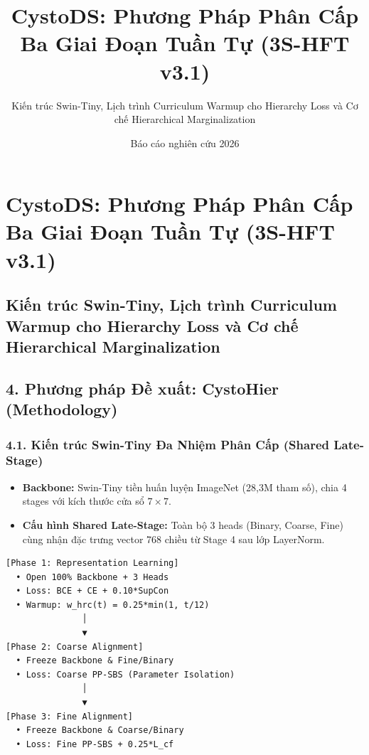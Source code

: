 \documentclass[
  11pt,
  a4paper,
]{article}
\title{CystoDS: Phương Pháp Phân Cấp Ba Giai Đoạn Tuần Tự (3S-HFT v3.1)}
\subtitle{Kiến trúc Swin-Tiny, Lịch trình Curriculum Warmup cho
Hierarchy Loss và Cơ chế Hierarchical Marginalization}
\author{}
\date{Báo cáo nghiên cứu 2026}
\providecommand{\tightlist}{%
  \setlength{\itemsep}{0pt}\setlength{\parskip}{0pt}}
\begin{document}
\maketitle

\section{CystoDS: Phương Pháp Phân Cấp Ba Giai Đoạn Tuần Tự (3S-HFT
v3.1)}\label{cystods-phux1b0ux1a1ng-phuxe1p-phuxe2n-cux1ea5p-ba-giai-ux111oux1ea1n-tuux1ea7n-tux1ef1-3s-hft-v3.1}

\subsection{Kiến trúc Swin-Tiny, Lịch trình Curriculum Warmup cho
Hierarchy Loss và Cơ chế Hierarchical
Marginalization}\label{kiux1ebfn-truxfac-swin-tiny-lux1ecbch-truxecnh-curriculum-warmup-cho-hierarchy-loss-vuxe0-cux1a1-chux1ebf-hierarchical-marginalization}

\subsection{4. Phương pháp Đề xuất: CystoHier
(Methodology)}\label{phux1b0ux1a1ng-phuxe1p-ux111ux1ec1-xuux1ea5t-cystohier-methodology}

\subsubsection{4.1. Kiến trúc Swin-Tiny Đa Nhiệm Phân Cấp (Shared
Late-Stage)}\label{kiux1ebfn-truxfac-swin-tiny-ux111a-nhiux1ec7m-phuxe2n-cux1ea5p-shared-late-stage}

\begin{itemize}
\tightlist
\item
  \textbf{Backbone:} Swin-Tiny tiền huấn luyện ImageNet (28,3M tham số),
  chia 4 stages với kích thước cửa sổ \(7 \times 7\).
\item
  \textbf{Cấu hình Shared Late-Stage:} Toàn bộ 3 heads (Binary, Coarse,
  Fine) cùng nhận đặc trưng vector 768 chiều từ Stage 4 sau lớp
  LayerNorm.
\end{itemize}

\begin{verbatim}
[Phase 1: Representation Learning]
  • Open 100% Backbone + 3 Heads
  • Loss: BCE + CE + 0.10*SupCon
  • Warmup: w_hrc(t) = 0.25*min(1, t/12)
               │
               ▼
[Phase 2: Coarse Alignment]
  • Freeze Backbone & Fine/Binary
  • Loss: Coarse PP-SBS (Parameter Isolation)
               │
               ▼
[Phase 3: Fine Alignment]
  • Freeze Backbone & Coarse/Binary
  • Loss: Fine PP-SBS + 0.25*L_cf
\end{verbatim}
\end{document}
